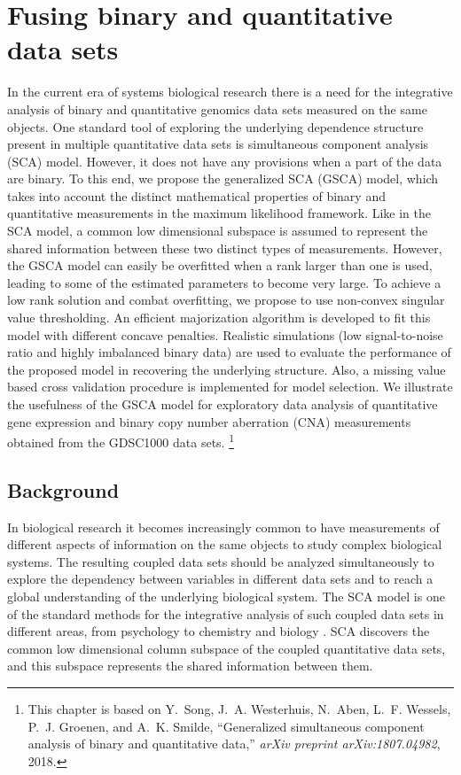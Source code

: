 \chapter{Fusing binary and quantitative data sets} \label{chapter:4}
In the current era of systems biological research there is a need for the integrative analysis of binary and quantitative genomics data sets measured on the same objects. One standard tool of exploring the underlying dependence structure present in multiple quantitative data sets is simultaneous component analysis (SCA) model. However, it does not have any provisions when a part of the data are binary. To this end, we propose the generalized SCA (GSCA) model, which takes into account the distinct mathematical properties of binary and quantitative measurements in the maximum likelihood framework. Like in the SCA model, a common low dimensional subspace is assumed to represent the shared information between these two distinct types of measurements. However, the GSCA model can easily be overfitted when a rank larger than one is used, leading to some of the estimated parameters to become very large. To achieve a low rank solution and combat overfitting, we propose to use non-convex singular value thresholding. An efficient majorization algorithm is developed to fit this model with different concave penalties. Realistic simulations (low signal-to-noise ratio and highly imbalanced binary data) are used to evaluate the performance of the proposed model in recovering the underlying structure. Also, a missing value based cross validation procedure is implemented for model selection. We illustrate the usefulness of the GSCA model for exploratory data analysis of quantitative gene expression and binary copy number aberration (CNA) measurements obtained from the GDSC1000 data sets.
\footnote{This chapter is based on Y.~Song, J.~A. Westerhuis, N.~Aben, L.~F. Wessels, P.~J. Groenen, and A.~K.
  Smilde, ``Generalized simultaneous component analysis of binary and
  quantitative data,'' {\em arXiv preprint arXiv:1807.04982}, 2018.}

\section{Background} \label{section:4.1}
In biological research it becomes increasingly common to have measurements of different aspects of information on the same objects to study complex biological systems. The resulting coupled data sets should be analyzed simultaneously to explore the dependency between variables in different data sets and to reach a global understanding of the underlying biological system. The SCA model is one of the standard methods for the integrative analysis of such coupled data sets in different areas, from psychology to chemistry and biology \cite{van2009structured}. SCA discovers the common low dimensional column subspace of the coupled quantitative data sets, and this subspace represents the shared information between them.

